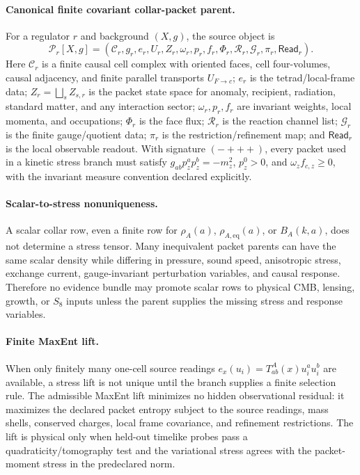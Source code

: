 \paragraph{Canonical finite covariant collar-packet parent.}
For a regulator \(r\) and background \((X,g)\), the source object is
\[
\mathcal P_r[X,g]=
(\mathcal C_r,g_r,e_r,U_r,Z_r,\omega_r,p_r,f_r,\Phi_r,\mathcal R_r,
\mathcal G_r,\pi_r,\mathsf{Read}_r).
\]
Here \(\mathcal C_r\) is a finite causal cell complex with oriented faces, cell
four-volumes, causal adjacency, and finite parallel transports \(U_{F\to c}\);
\(e_r\) is the tetrad/local-frame data; \(Z_r=\bigsqcup_s Z_{s,r}\) is the
packet state space for anomaly, recipient, radiation, standard matter, and any
interaction sector; \(\omega_r,p_r,f_r\) are invariant weights, local momenta,
and occupations; \(\Phi_r\) is the face flux; \(\mathcal R_r\) is the reaction
channel list; \(\mathcal G_r\) is the finite gauge/quotient data; \(\pi_r\) is
the restriction/refinement map; and \(\mathsf{Read}_r\) is the local observable
readout.  With signature \((-+++)\), every packet used in a kinetic stress
branch must satisfy \(g_{ab}p_z^ap_z^b=-m_z^2\), \(p_z^0>0\), and
\(\omega_z f_{c,z}\ge0\), with the invariant measure convention declared
explicitly.

\paragraph{Scalar-to-stress nonuniqueness.}
A scalar collar row, even a finite row for \(\rho_A(a)\), \(\rho_{A,\mathrm{eq}}(a)\),
or \(B_A(k,a)\), does not determine a stress tensor.  Many inequivalent packet
parents can have the same scalar density while differing in pressure, sound
speed, anisotropic stress, exchange current, gauge-invariant perturbation
variables, and causal response.  Therefore no evidence bundle may promote scalar rows
to physical CMB, lensing, growth, or \(S_8\) inputs unless the parent supplies
the missing stress and response variables.

\paragraph{Finite MaxEnt lift.}
When only finitely many one-cell source readings
\(e_x(u_i)=T^A_{ab}(x)u_i^au_i^b\) are available, a stress lift is not unique
until the branch supplies a finite selection rule.  The admissible MaxEnt lift
minimizes no hidden observational residual: it maximizes the declared packet
entropy subject to the source readings, mass shells, conserved charges, local
frame covariance, and refinement restrictions.  The lift is physical only when
held-out timelike probes pass a quadraticity/tomography test and the
variational stress agrees with the packet-moment stress in the predeclared norm.

